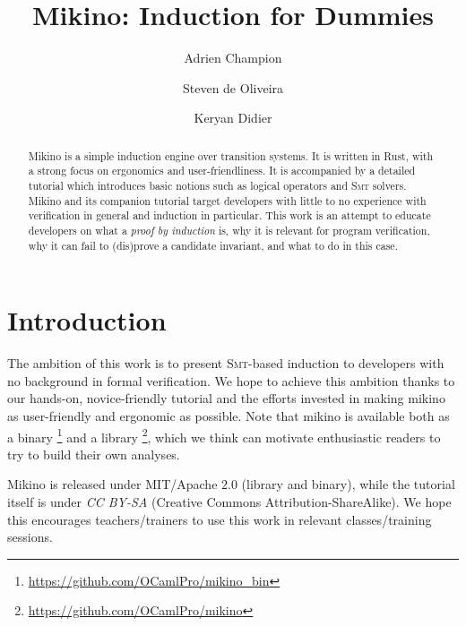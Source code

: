 \documentclass{easychair}
\title{%
    Mikino: Induction for Dummies%
}
\author{%
    Adrien Champion%
    \and Steven de Oliveira
    \and Keryan Didier
}
\institute{%
    OCamlPro,\\%
    \email{name.last-name@ocamlpro.com}%
}
\newcommand{\Mkn}{Mikino}
\newcommand{\mkn}{mikino}
\newcommand{\rust}{Rust}
\newcommand{\smt}{\textsc{Smt}}
\newcommand{\presecspace}{\vspace{-.3cm}}
\newcommand{\ita}[1]{\textit{#1}}
\begin{document}
\maketitle

\begin{abstract}
    \Mkn{} is a simple induction engine over transition systems. It is written in \rust{}, with a
    strong focus on ergonomics and user-friendliness. It is accompanied by a detailed tutorial
    which introduces basic notions such as logical operators and \smt{} solvers. \Mkn{} and its
    companion tutorial target developers with little to no experience with verification in general
    and induction in particular. This work is an attempt to educate developers on what a \ita{proof
    by induction} is, why it is relevant for program verification, why it can fail to (dis)prove a
    candidate invariant, and what to do in this case.
\end{abstract}



\presecspace{}
\section{Introduction}%
\label{sec:intro}


The ambition of this work is to present \smt{}-based induction to developers with no background in
formal verification. We hope to achieve this ambition thanks to our hands-on, novice-friendly
tutorial and the efforts invested in making \mkn{} as user-friendly and ergonomic as possible.
%
Note that \mkn{} is available both as a binary%
%
\footnote{%
    \url{https://github.com/OCamlPro/mikino_bin}%
}
%
and a library%
%
\footnote{
    \url{https://github.com/OCamlPro/mikino}%
},
%
which we think can motivate enthusiastic readers to try to build their own analyses.

\Mkn{} is released under \textsc{MIT}/Apache \(2.0\) (library and binary), while the tutorial
itself is under \ita{CC BY-SA} (Creative Commons Attribution-ShareAlike). We hope this encourages
teachers/trainers to use this work in relevant classes/training sessions.
\end{document}
